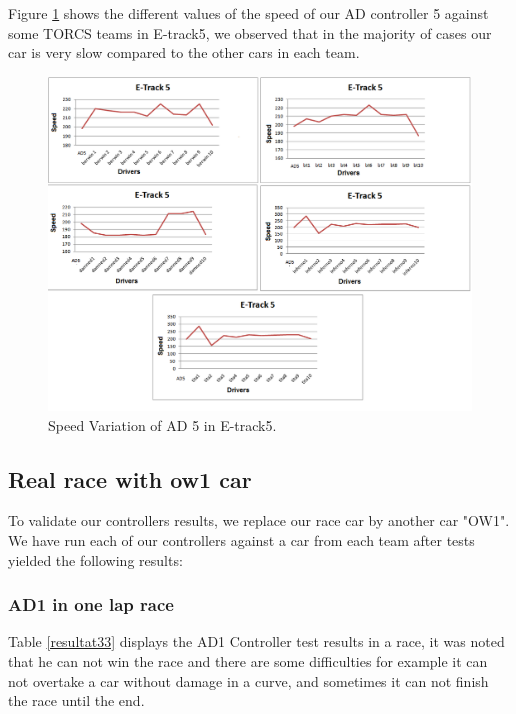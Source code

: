 \documentclass{llncs}
\begin{document}
Figure \ref{speed} shows the different values of the speed of our AD controller 5 against some TORCS teams in E-track5, we observed that in the majority of cases our car is very slow compared to the other cars in each team. \\

\begin{figure}[h!]
	
	\centering
	\includegraphics[width=1.1\textwidth]{fig/SpeedRace.png}
	\begin{minipage}{10cm}
		\centering
		\caption{\footnotesize Speed Variation of AD 5 in E-track5.}
		\label{speed}
	\end{minipage} 
	
	
\end{figure}
\subsection{Real race with ow1 car}
To validate our controllers results, we replace our race car by another car  "OW1". We have run each of our controllers against a car from each team after tests yielded the following results: \\	

\subsubsection{AD1 in one lap race}
Table \ref{resultat33}  displays the AD1 Controller test results in a race, it was noted that he can not win the race and there are some difficulties for example it can not  overtake a car without damage in a curve, and sometimes it can not finish the race until the end.
\end{document}
